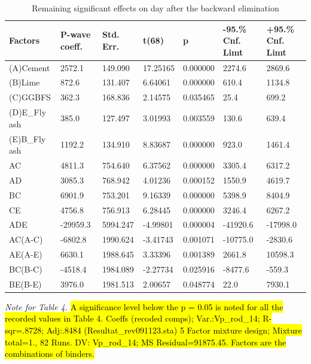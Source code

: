 \documentclass[materials,article,submit,pdftex,moreauthors]{Definitions/mdpi}
\begin{document}
\begin{table}[H]
\begin{threeparttable}
\caption{Remaining significant effects on day  after the backward elimination}
\footnotesize
    \centering
    \begin{tabular}{|l|l|l|l|l|l|l|}
    \hline
        Factors & P-wave coeff. & Std. Err. & t(68) & p & -95.\% Cnf. Limt & +95.\% Cnf. Limt \\ \hline
        (A)Cement & 2572.1 & 149.090 & 17.25165 & 0.000000 & 2274.6 & 2869.6 \\ \hline
        (B)Lime & 872.6 & 131.407 & 6.64061 & 0.000000 & 610.4 & 1134.8 \\ \hline
        (C)GGBFS & 362.3 & 168.836 & 2.14575 & 0.035465 & 25.4 & 699.2 \\ \hline
        (D)E\_Fly ash & 385.0 & 127.497 & 3.01993 & 0.003559 & 130.6 & 639.4 \\ \hline
        (E)B\_Fly ash & 1192.2 & 134.910 & 8.83687 & 0.000000 & 923.0 & 1461.4 \\ \hline
        AC & 4811.3 & 754.640 & 6.37562 & 0.000000 & 3305.4 & 6317.2 \\ \hline
        AD & 3085.3 & 768.942 & 4.01236 & 0.000152 & 1550.9 & 4619.7 \\ \hline
        BC & 6901.9 & 753.201 & 9.16339 & 0.000000 & 5398.9 & 8404.9 \\ \hline
        CE & 4756.8 & 756.913 & 6.28445 & 0.000000 & 3246.4 & 6267.2 \\ \hline
        ADE & -29959.3 & 5994.247 & -4.99801 & 0.000004 & -41920.6 & -17998.0 \\ \hline
        AC(A-C) & -6802.8 & 1990.624 & -3.41743 & 0.001071 & -10775.0 & -2830.6 \\ \hline
        AE(A-E) & 6630.1 & 1988.645 & 3.33396 & 0.001389 & 2661.8 & 10598.3 \\ \hline
        BC(B-C) & -4518.4 & 1984.089 & -2.27734 & 0.025916 & -8477.6 & -559.3 \\ \hline
        BE(B-E) & 3976.0 & 1981.513 & 2.00657 & 0.048774 & 22.0 & 7930.1 \\ \hline
\end{tabular}\label{tab:4}
    \begin{tablenotes}
      \scriptsize
      	\item \emph{Note for Table 4.} \hl{A significance level below the p = 0.05 is noted for all the recorded values in Table 4. Coeffs (recoded comps); Var.:Vp\_rod\_14; R-sqr=.8728; Adj:.8484 (Resultat\_rev091123.sta) 5 Factor mixture design; Mixture total=1., 82 Runs. DV: Vp\_rod\_14; MS Residual=91875.45. Factors are the combinations of binders.}
    \end{tablenotes}
  \end{threeparttable}
\end{table}
\end{document}
